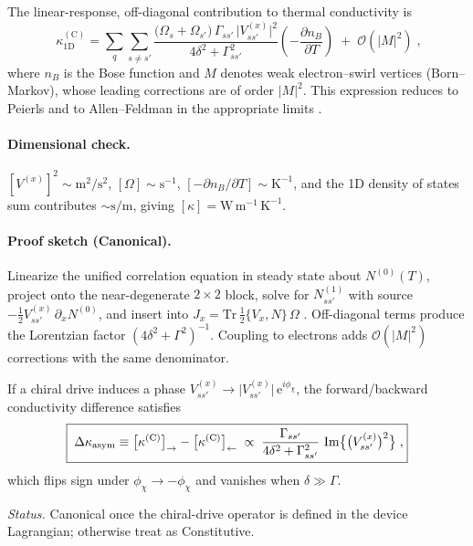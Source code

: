 \documentclass[10pt,reprint,aps,onecolumn,nofootinbib]{revtex4-2}
\newcommand{\ee}{\mathrm{e}}
\begin{document}
    \begin{corollary}
    \label{cor:kappaC1D}
    The linear-response, off-diagonal contribution to thermal conductivity is
    \begin{equation}
    \boxed{\;\kappa^{(\mathrm C)}_{1\mathrm D}
    =\sum_{q}\sum_{s\neq s'}\frac{\big(\Omega_s+\Omega_{s'}\big)\,\Gamma_{ss'}\,\big|V^{(x)}_{ss'}\big|^2}{4\delta^2+\Gamma_{ss'}^2}
    \left(-\frac{\partial n_B}{\partial T}\right)
    \; +\; \mathcal O(|M|^2)\;,}
    \end{equation}
    where $n_B$ is the Bose function and $M$ denotes weak electron–swirl vertices (Born–Markov), whose leading corrections are of order $|M|^2$. This expression reduces to Peierls and to Allen–Feldman in the appropriate limits \cite{Peierls1929,AllenFeldman1993,Simoncelli2019Unified,Hardy1963}.
    \end{corollary}


    \paragraph{Dimensional check.} $[V^{(x)}]^2\sim\mathrm{m^2/s^2}$, $[\Omega]\sim\mathrm{s^{-1}}$, $[-\partial n_B/\partial T]\sim\mathrm{K^{-1}}$, and the 1D density of states sum contributes $\sim \mathrm{s/m}$, giving $[\kappa]=\mathrm{W\,m^{-1}\,K^{-1}}$.


    \paragraph{Proof sketch (Canonical).} Linearize the unified correlation equation \cite{Simoncelli2019Unified} in steady state about $N^{(0)}(T)$, project onto the near-degenerate $2\times2$ block, solve for $N^{(1)}_{ss'}$ with source $-\tfrac12 V^{(x)}_{ss'}\,\partial_x N^{(0)}$, and insert into $J_x=\mathrm{Tr}\,\tfrac12\{V_x, N\}\,\Omega$ \cite{Hardy1963}. Off-diagonal terms produce the Lorentzian factor $(4\delta^2+\Gamma^2)^{-1}$. Coupling to electrons adds $\mathcal O(|M|^2)$ corrections with the same denominator.


    \begin{corollary}
    \label{cor:nonrec}
    If a chiral drive induces a phase $V^{(x)}_{ss'}\to \big|V^{(x)}_{ss'}\big|\,\ee^{i\phi_\chi}$, the forward/backward conductivity difference satisfies
    \begin{equation}
    \boxed{\;\Delta\kappa_{\rm asym}\equiv \big[\kappa^{(\mathrm C)}\big]_{\rightarrow}-\big[\kappa^{(\mathrm C)}\big]_{\leftarrow}
    \;\propto\;\frac{\Gamma_{ss'}}{4\delta^2+\Gamma_{ss'}^2}\,\Im\!\big\{\big(V^{(x)}_{ss'}\big)^2\big\}\;,}
    \end{equation}
    which flips sign under $\phi_\chi\to-\phi_\chi$ and vanishes when $\delta\gg\Gamma$.
    \end{corollary}
    \emph{Status.} Canonical once the chiral-drive operator is defined in the device Lagrangian; otherwise treat as Constitutive.
\end{document}
